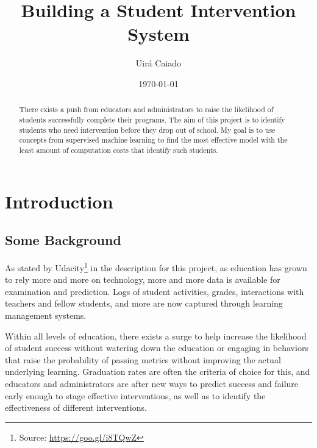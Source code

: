 \documentclass[a4paper]{article}
\title{Building a Student Intervention System}
\author{Uirá Caiado}
\date{\today}
\begin{document}
\maketitle

\begin{abstract}
There exists a push from educators and administrators to raise the likelihood of students successfully complete their programs. The aim of this project is to identify students who need intervention before they drop out of school. My goal is to use concepts from supervised machine learning to find the most effective model with the least amount of computation costs that identify such students.
\end{abstract}


\section{Introduction}
\label{sec:introduction}


\subsection{Some Background}
As stated by Udacity\footnote{Source: \url{https://goo.gl/i8TQwZ}} in the description for this project, as education has grown to rely more and more on technology, more and more data is available for examination and prediction. Logs of student activities, grades, interactions with teachers and fellow students, and more are now captured through learning management systems.

Within all levels of education, there exists a surge to help increase the likelihood of student success without watering down the education or engaging in behaviors that raise the probability of passing metrics without improving the actual underlying learning. Graduation rates are often the criteria of choice for this, and educators and administrators are after new ways to predict success and failure early enough to stage effective interventions, as well as to identify the effectiveness of different interventions.
\end{document}
